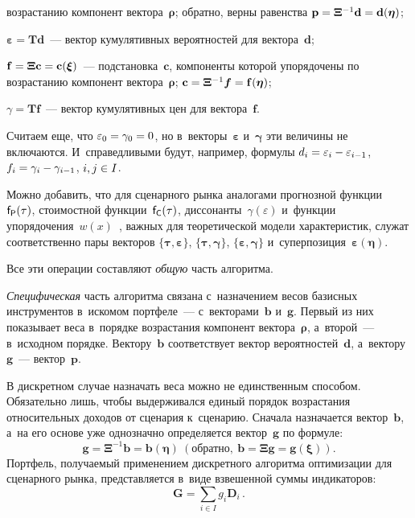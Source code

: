 \begin{multicols}{2}
\begin{description}
возрастанию компонент вектора~$\boldsymbol{\rho}$; обратно, верны 
равенства $\mathbf{p}\hm= \boldsymbol{\Xi}^{-1} \mathbf{d}\hm= 
\mathbf{d}(\boldsymbol{\eta})$;
  \item[\,] $\boldsymbol{\varepsilon}=\mathbf{T}\mathbf{d}$~--- вектор 
кумулятивных вероятностей для вектора~$\mathbf{d}$; 
  \item[\,] $\mathbf{f}=\boldsymbol{\Xi}\mathbf{c}\hm= 
\mathbf{c}(\boldsymbol{\xi})$~--- подстановка~$\mathbf{c}$, компоненты 
которой упорядочены по возрастанию компонент вектора~$\boldsymbol{\rho}$; 
$\mathbf{c}\hm= \boldsymbol{\Xi}^{-1} \boldsymbol{f}\hm= 
\mathbf{f}(\boldsymbol{\eta})$;
  \item[\,] $\gamma=\mathbf{T}\mathbf{f}$~--- вектор кумулятивных цен для 
вектора~$\mathbf{f}$.
  \end{description}
  
  Считаем еще, что $\varepsilon_0\hm=\gamma_0\hm=0$, но 
в~векторы~$\boldsymbol{\varepsilon}$ и~$\boldsymbol{\gamma}$ эти величины 
не включаются. И~справедливыми будут, например, формулы $d_i\hm=
  \varepsilon_i \hm- \varepsilon_{i-1}$, $f_i\hm=\gamma_i \hm- \gamma_{i-1}$, $i,j\hm\in I$.
  
  Можно добавить, что для сценарного рынка аналогами прогнозной 
функции~${\sf f}_{\sf P}(\tau)$, стоимостной функции~${\sf f}_{\sf C}(\tau)$, 
диссонанты~$\gamma(\varepsilon)$ и~функции упорядочения~$w(x)$~\cite{5-ag}, 
важных для теоретической модели характеристик, служат соответственно пары 
векторов $\{\boldsymbol{\tau},\boldsymbol{\varepsilon}\}$, 
$\{\boldsymbol{\tau},\boldsymbol{\gamma}\}$, 
$\{\boldsymbol{\varepsilon},\boldsymbol{\gamma}\}$ 
и~суперпозиция~$\boldsymbol{\varepsilon}(\boldsymbol{\eta})$. 
  
  Все эти операции составляют \textit{общую} часть алгоритма. 
  
  \textit{Специфическая} часть алгоритма связана с~назначением весов 
базисных инструментов в~искомом портфеле~--- с~векторами~$\mathbf{b}$ 
и~$\mathbf{g}$. Первый из них показывает веса в~порядке возрастания 
компонент вектора~$\boldsymbol{\rho}$, а~второй~--- в~исходном порядке. 
Вектору~$\mathbf{b}$ соответствует вектор вероятностей~$\mathbf{d}$, 
а~вектору~$\mathbf{g}$~--- вектор~$\mathbf{p}$.
  
  В дискретном случае назначать веса можно не единственным способом. 
Обязательно лишь, чтобы выдерживался единый порядок возрастания 
относительных доходов от сценария к~сценарию. Сначала назначается 
вектор~$\mathbf{b}$, а~на его основе уже однозначно определяется 
вектор~$\mathbf{g}$ по формуле: 
  $$
  \mathbf{g}=\boldsymbol{\Xi}^{-1} 
\mathbf{b}=\mathbf{b}(\boldsymbol{\eta})\ (\mbox{обратно},\ 
\mathbf{b}=\boldsymbol{\Xi}\mathbf{g}=\mathbf{g}(\boldsymbol{\xi})).
  $$ 
  Портфель, получаемый применением дискретного алгоритма оптимизации 
для сценарного рынка, представляется в~виде взвешенной суммы индикаторов:
  $$
  \mathbf{G} = \sum\limits_{i\in I} g_i \mathbf{D}_i\,.
  $$
  

\end{multicols}
